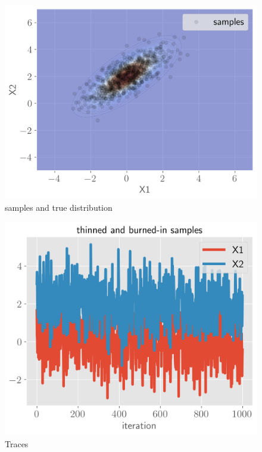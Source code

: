 \documentclass[11pt]{article}
\begin{document}
\begin{figure}[!h]
    \centering
    \includegraphics[scale=.6
    ]{../figures/bivar.png}
    \caption{samples and true distribution}
    \label{fig:my_label}
\end{figure}

\begin{figure}[!h]
    \centering
    \includegraphics[scale=.6
    ]{../figures/traces.png}
    \caption{Traces}
    \label{fig:my_label}
\end{figure}
\end{document}
